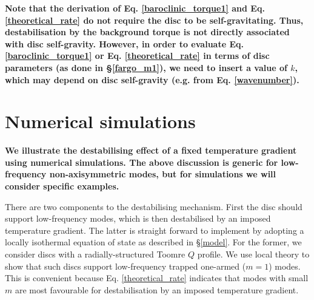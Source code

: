 {\bf Note that the derivation of Eq. \ref{baroclinic_torque1} and 
  Eq. \ref{theoretical_rate} do not 
  require the disc to be self-gravitating. Thus, destabilisation by the
  background torque is not directly associated with disc
  self-gravity. However, in order to evaluate 
  Eq. \ref{baroclinic_torque1} or Eq. \ref{theoretical_rate} in terms 
  of disc parameters (as done in \S\ref{fargo_m1}), we need to insert a 
  value of $k$, which may depend on disc    
  self-gravity (e.g. from Eq. \ref{wavenumber}).  
}   





\section{Numerical simulations}\label{methods}
{\bf
  We illustrate the destabilising effect of a fixed temperature
  gradient using numerical simulations. The above discussion is
  generic for low-frequency non-axisymmetric modes, but for
  simulations we will consider specific examples.  
  
  There are two components to the destabilising mechanism.  First
  the disc should support low-frequency modes, which is then
  destabilised by an imposed temperature gradient. The latter is
  straight forward to implement by adopting a locally isothermal
  equation of state as described in \S\ref{model}.  For the former, we
  consider discs with a  
  radially-structured Toomre $Q$ profile. We use local theory to show that such discs support
  low-frequency trapped one-armed ($m=1$) modes. 
  This is convenient because Eq. \ref{theoretical_rate} indicates that
  modes with small $m$ are
  most favourable for destabilisation by an imposed temperature
  gradient.  
}


